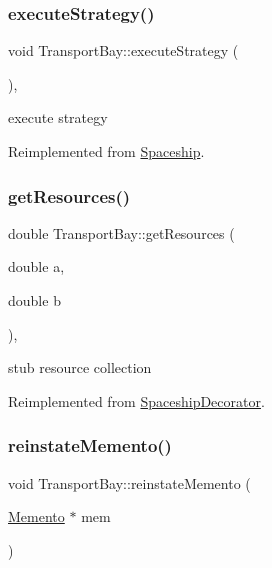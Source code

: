 \mbox{\label{classTransportBay_a04aea7cba776cb1a8fd40f40cc6f495c}} 
\subsubsection{\texorpdfstring{execute\+Strategy()}{executeStrategy()}}
{\footnotesize\ttfamily void Transport\+Bay\+::execute\+Strategy (\begin{DoxyParamCaption}{ }\end{DoxyParamCaption})\hspace{0.3cm}{\ttfamily [inline]}, {\ttfamily [virtual]}}

execute strategy 

Reimplemented from \hyperlink{classSpaceship}{Spaceship}.

\mbox{\label{classTransportBay_afac369115f4c17522a123f36be183e29}} 
\subsubsection{\texorpdfstring{get\+Resources()}{getResources()}}
{\footnotesize\ttfamily double Transport\+Bay\+::get\+Resources (\begin{DoxyParamCaption}\item[{double}]{a,  }\item[{double}]{b }\end{DoxyParamCaption})\hspace{0.3cm}{\ttfamily [inline]}, {\ttfamily [virtual]}}

stub resource collection 

Reimplemented from \hyperlink{classSpaceshipDecorator_a5ee7a9a8c146c85f08591e47d971dce7}{Spaceship\+Decorator}.

\mbox{\label{classTransportBay_a501256401b6845a16ced9ea65c294f70}} 
\subsubsection{\texorpdfstring{reinstate\+Memento()}{reinstateMemento()}}
{\footnotesize\ttfamily void Transport\+Bay\+::reinstate\+Memento (\begin{DoxyParamCaption}\item[{\hyperlink{classMemento}{Memento} $\ast$}]{mem }\end{DoxyParamCaption})\hspace{0.3cm}{\ttfamily [virtual]}}

